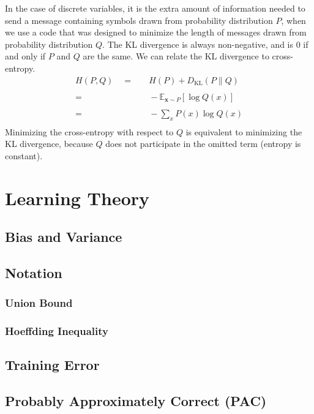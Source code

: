 \documentclass[twoside,twocolumn]{article}
\begin{document}
In the case of discrete variables, it is the extra amount of information
needed to send a message containing symbols drawn from probability distribution
$P$, when we use a code that was designed to minimize the length of messages
drawn from probability distribution $Q$. The KL divergence is always
non-negative, and is $0$ if and only if $P$ and $Q$ are the same. We can
relate the KL divergence to cross-entropy.
\begin{equation}
  \begin{split}
    H(P, Q) \quad =& \quad H(P) + D _ { \mathrm { KL } } ( P \| Q ) \\
    \\
    =& \quad - \mathbb { E } _ { \mathbf { x } \sim P } \left[ \log Q ( x ) \right]\\
    \\
    =& \quad -\sum_x P(x) \log Q(x) \\
  \end{split}
\end{equation}
Minimizing the cross-entropy with respect to $Q$ is equivalent to
minimizing the KL divergence, because $Q$ does not participate in the
omitted term (entropy is constant).
\section{Learning Theory}
\subsection{Bias and Variance}
\subsection{Notation}
\subsubsection{Union Bound}
\subsubsection{Hoeffding Inequality}
\subsection{Training Error}
\subsection{Probably Approximately Correct (PAC)}
\end{document}
